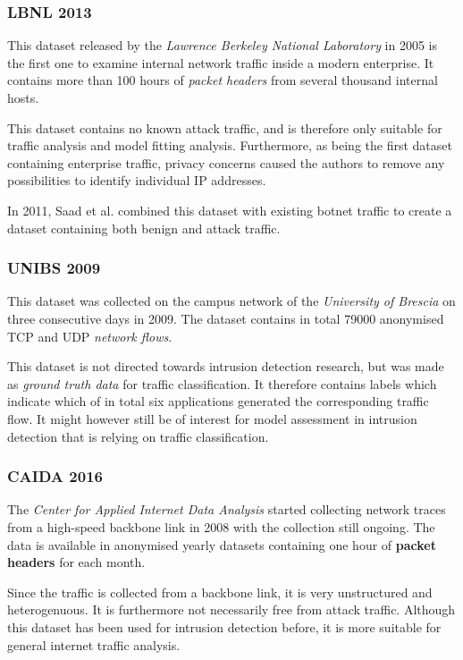 \documentclass[a4paper,12pt,twoside]{report}
\begin{document}
\subsubsection*{LBNL 2013 \cite{pang2005first}}

This dataset released by the \textit{Lawrence Berkeley National Laboratory} in 2005 is the first one to examine internal network traffic inside a modern enterprise. It contains more than 100 hours of \textit{packet headers} from several thousand internal hosts. 

This dataset contains no known attack traffic, and is therefore only suitable for traffic analysis and model fitting analysis. Furthermore, as being the first dataset containing enterprise traffic, privacy concerns caused the authors to remove any possibilities to identify individual IP addresses.

In 2011, Saad et al. \cite{saad2011detecting} combined this dataset with existing botnet traffic to create a dataset containing both benign and attack traffic. 

\subsubsection*{UNIBS 2009\cite{UNIBS2009data}}

This dataset was collected on the campus network of the \textit{University of Brescia} on three consecutive days in 2009. The dataset contains in total 79000 anonymised TCP and UDP \textit{network flows}. 

This dataset is not directed towards intrusion detection research, but was made as \textit{ground truth data} for traffic classification. It therefore contains labels which indicate which of in total six applications generated the corresponding traffic flow. It might however still be of interest for model assessment in intrusion detection that is relying on traffic classification.

\subsubsection*{CAIDA 2016 \cite{walsworth2015caida}}

The \textit{Center for Applied Internet Data Analysis} started collecting network traces from a high-speed backbone link in 2008 with the collection still ongoing. The data is available in anonymised yearly datasets containing one hour of \textbf{packet headers} for each month. 

Since the traffic is collected from a backbone link, it is very unstructured and heterogenuous. It is furthermore not necessarily free from attack traffic. Although this dataset has been used for intrusion detection before, it is more suitable for general internet traffic analysis.
\end{document}

